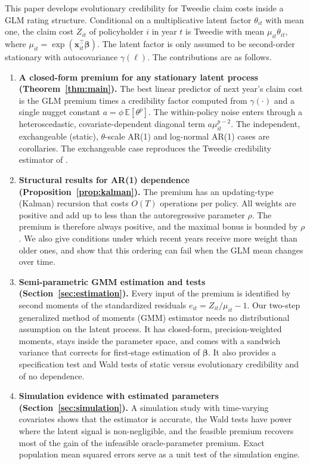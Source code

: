 \documentclass[mathematics,article,submit,moreauthors]{Definitions/mdpi}
\newcommand{\E}{\mathbb{E}}
\newcommand{\bx}{\boldsymbol{x}}
\newcommand{\bbeta}{\boldsymbol{\beta}}
\begin{document}
This paper develops evolutionary credibility for Tweedie claim costs inside a GLM rating structure. Conditional on a multiplicative latent factor $\theta_{it}$ with mean one, the claim cost $Z_{it}$ of policyholder $i$ in year $t$ is Tweedie with mean $\mu_{it}\theta_{it}$, where $\mu_{it}=\exp(\bx_{it}^\top\bbeta)$. The latent factor is only assumed to be second-order stationary with autocovariance $\gamma(\ell)$. The contributions are as follows.
\begin{enumerate}
\item \textbf{A closed-form premium for any stationary latent process (Theorem~\ref{thm:main}).} The best linear predictor of next year's claim cost is the GLM premium times a credibility factor computed from $\gamma(\cdot)$ and a single nugget constant $a=\phi\,\E[\theta^p]$. The within-policy noise enters through a heteroscedastic, covariate-dependent diagonal term $a\mu_{it}^{p-2}$. The independent, exchangeable (static), $\theta$-scale AR(1) and log-normal AR(1) cases are corollaries. The exchangeable case reproduces the Tweedie credibility estimator of \citet{ohlsson2006exact}.
\item \textbf{Structural results for AR(1) dependence (Proposition~\ref{prop:kalman}).} The premium has an updating-type (Kalman) recursion that costs $O(T)$ operations per policy. All weights are positive and add up to less than the autoregressive parameter $\rho$. The premium is therefore always positive, and the maximal bonus is bounded by $\rho$. We also give conditions under which recent years receive more weight than older ones, and show that this ordering can fail when the GLM mean changes over time.
\item \textbf{Semi-parametric GMM estimation and tests (Section~\ref{sec:estimation}).} Every input of the premium is identified by second moments of the standardized residuals $e_{it}=Z_{it}/\mu_{it}-1$. Our two-step generalized method of moments (GMM) estimator needs no distributional assumption on the latent process. It has closed-form, precision-weighted moments, stays inside the parameter space, and comes with a sandwich variance that corrects for first-stage estimation of $\bbeta$. It also provides a \citet{hansen1982} specification test and Wald tests of static versus evolutionary credibility and of no dependence.
\item \textbf{Simulation evidence with estimated parameters (Section~\ref{sec:simulation}).} A simulation study with time-varying covariates shows that the estimator is accurate, the Wald tests have power where the latent signal is non-negligible, and the feasible premium recovers most of the gain of the infeasible oracle-parameter premium. Exact population mean squared errors serve as a unit test of the simulation engine.
\end{enumerate}
\end{document}
